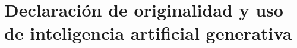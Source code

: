 \chapter{Declaración de originalidad y uso de inteligencia artificial generativa}
\label{anx:uso-ia}
